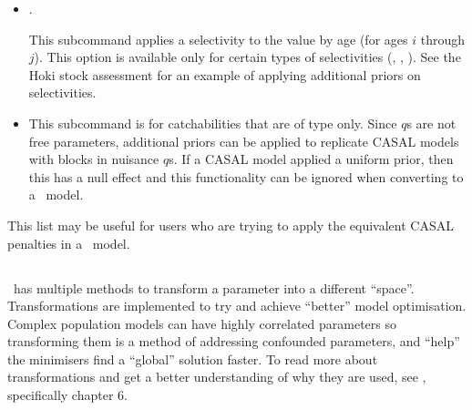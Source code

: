 \begin{itemize}
	\item {}.

	This subcommand applies a selectivity to the value by age (for ages $i$ through $j$). This option is available only for certain types of selectivities (, , ). See the Hoki stock assessment for an example of applying additional priors on selectivities.

	\item {}

	This subcommand is for catchabilities that are of type  only. Since  $q$s are not free parameters, additional priors can be applied to replicate CASAL models with  blocks in nuisance $q$s. If a CASAL model applied a uniform prior, then this has a null effect and this functionality can be ignored when converting to a \CNAME\ model.
\end{itemize}

This list may be useful for users who are trying to apply the equivalent CASAL penalties in a \CNAME\ model.

\subsection{\label{sec:Transformation}}
\CNAME\ has multiple methods to transform a parameter into a different \enquote{space}. Transformations are implemented to try and achieve \enquote{better} model optimisation. Complex population models can have highly correlated parameters so transforming them is a method of addressing confounded parameters, and \enquote{help} the minimisers find a \enquote{global} solution faster. To read more about transformations and get a better understanding of why they are used, see \cite{gilks1995markov}, specifically chapter 6.


